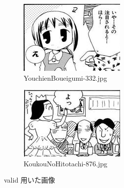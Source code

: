 \documentclass[onecolumn]{ujarticle}   %
\begin{document}
	\begin{figure}[h]
		\centering
		\begin{subfigure}{0.49\columnwidth}
			\centering
			\includegraphics[width=0.9\columnwidth]{data/YouchienBoueigumi-332.jpg}
				\caption{YouchienBoueigumi-332.jpg}
		\end{subfigure}
		\begin{subfigure}{0.49\columnwidth}
			\centering
			\includegraphics[width=0.9\columnwidth]{data/KoukouNoHitotachi-876.jpg}
				\caption{KoukouNoHitotachi-876.jpg}
		\end{subfigure}
		\caption{valid 用いた画像}
		\label{fig:target}
	\end{figure}
\end{document}

